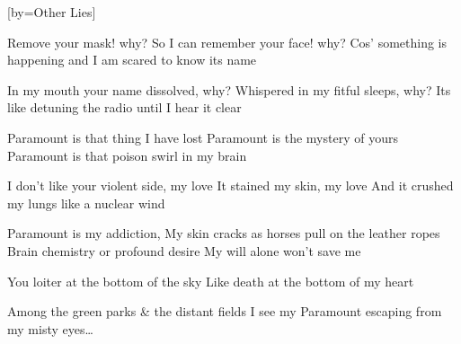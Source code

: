 [by={Other Lies}]


  \chordsoff
  \beginverse
  Remove your mask! why?
  So I can remember your face! why?
  Cos’ something is happening
  and I am scared to know its name
  \endverse

  \beginverse
  In my mouth your name dissolved, why?
  Whispered in my fitful sleeps, why?
  Its like detuning the radio until I hear it clear 
  \endverse

  \beginchorus
  
  Paramount is that thing I have lost
  Paramount is the mystery of yours
  Paramount is that poison swirl in my brain
  \endchorus

  \beginverse
  I don’t like your violent side, my love
  It stained my skin, my love
  And it crushed my lungs like a nuclear wind
  \endverse

  \beginverse
  Paramount is my addiction,
  My skin cracks as horses pull on the leather ropes
  Brain chemistry or profound desire 
  My will alone won't save me
  \endverse
  

  \beginverse  
  You loiter at the bottom of the sky
  Like death at the bottom of my heart
  \endverse

  \beginchorus
  Among the green parks \& the distant fields
  I see my Paramount escaping from my misty eyes…
  \endchorus
\endsong
